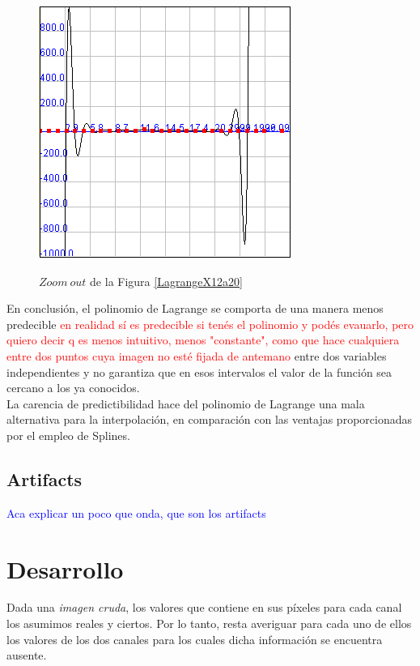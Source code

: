 \documentclass[a4paper]{article}
\begin{document}
\begin{figure}
	\caption{$Zoom \ out$ de la Figura \ref{LagrangeX12a20}}
	\begin{center}
	\includegraphics[scale=1]{imagenes/LagrangeX12a20(zoomOut)}
	\label{LagrangeX12a20(zoomOut)}
  \end{center}
\end{figure}


En conclusión, el polinomio de Lagrange se comporta de una manera menos predecible \textcolor{red}{en realidad sí es predecible si tenés el polinomio y podés evauarlo, pero quiero decir q es menos intuitivo, menos "constante", como que hace cualquiera entre dos puntos cuya imagen no esté fijada de antemano} entre dos variables independientes y no garantiza que en esos intervalos el valor de la función sea cercano a los ya conocidos.\\
La carencia de predictibilidad hace del polinomio de Lagrange una mala alternativa para la interpolación, en comparación con las ventajas proporcionadas por el empleo de Splines.\\


\newpage
\subsection{Artifacts}
\textcolor{blue}{Aca explicar un poco que onda,  que son los artifacts}

\newpage
\section{Desarrollo}

Dada una \textit{imagen cruda}, los valores que contiene en sus píxeles para cada canal los asumimos reales y ciertos. Por lo tanto, resta averiguar para cada uno de ellos los valores de los dos canales para los cuales dicha información se encuentra ausente.
\end{document}
